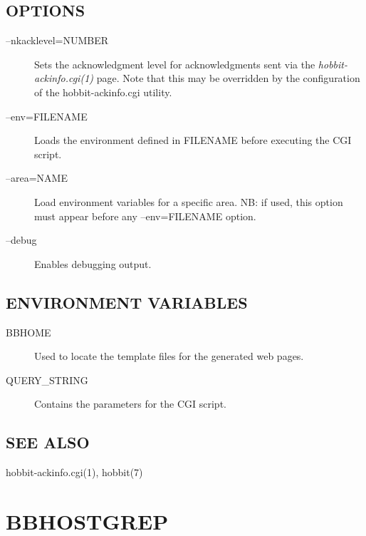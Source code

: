  
\subsection{OPTIONS}
\begin{description}
\item[--nkacklevel=NUMBER] Sets the acknowledgment level for
  acknowledgments sent via the \emph{hobbit-ackinfo.cgi(1)} page. Note
  that this may be overridden by the configuration of the
  hobbit-ackinfo.cgi utility. 


 

\item[--env=FILENAME] Loads the environment defined in FILENAME before
  executing the CGI script. 


 

\item[--area=NAME] Load environment variables for a specific area. NB:
  if used, this option must appear before any --env=FILENAME option. 


 

\item[--debug] Enables debugging output. 

 


\end{description}
\subsection{ENVIRONMENT VARIABLES}
\begin{description}
\item[BBHOME] Used to locate the template files for the generated web pages. 

 

\item[QUERY\_STRING] Contains the parameters for the CGI script. 


\end{description}
\subsection{SEE ALSO}
hobbit-ackinfo.cgi(1), hobbit(7) 


%
\newpage
\section{BBHOSTGREP}


